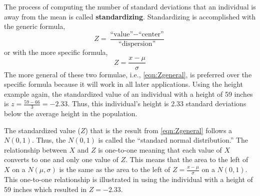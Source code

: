 \documentclass[10pt,openany]{book}\usepackage[]{graphicx}\usepackage[]{color}
\begin{document}
The process of computing the number of standard deviations that an individual is away from the mean is called \textbf{standardizing}.  Standardizing is accomplished with the generic formula,
\begin{equation}
  \label{eqn:Zgeneral}
    Z = \frac{\text{``value''}-\text{``center''}}{\text{``dispersion''}}
\end{equation}
or with the more specific formula,
\begin{equation}
  \label{eqn:Zspecific}
    Z = \frac{x-\mu}{\sigma}
\end{equation}
The more general of these two formulae, i.e., \eqref{eqn:Zgeneral}, is preferred over the specific formula because it will work in all later applications.  Using the height example again, the standardized value of an individual with a height of 59 inches is $z=\frac{59-66}{3}=-2.33$.  Thus, this individual's height is 2.33 standard deviations below the average height in the population.

The standardized value ($Z$) that is the result from \eqref{eqn:Zgeneral} follows a $N(0,1)$.  Thus, the $N(0,1)$ is called the ``standard normal distribution.''  The relationship between $X$ and $Z$ is one-to-one meaning that each value of $X$ converts to one and only one value of $Z$.  This means that the area to the left of $X$ on a $N(\mu,\sigma)$ is the same as the area to the left of $Z = \frac{x-\mu}{\sigma}$ on a $N(0,1)$.  This one-to-one relationship is illustrated in  using the individual with a height of 59 inches which resulted in $Z=-2.33$.

\end{document}
